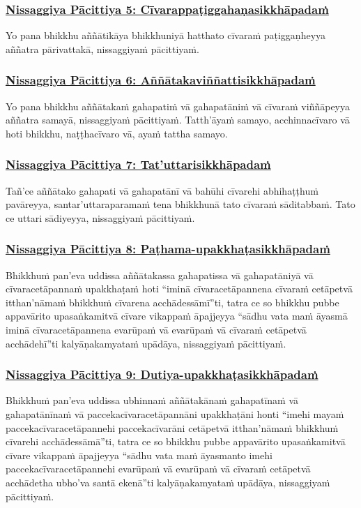 \subsubsection*{\hyperref[forf-exp5]{Nissaggiya Pācittiya 5: Cīvarappaṭiggahaṇasikkhāpadaṁ}}
\label{np5}
Yo pana bhikkhu aññātikāya bhikkhuniyā hatthato cīvaraṁ paṭiggaṇheyya aññatra pārivattakā, nissaggiyaṁ pācittiyaṁ.

\subsubsection*{\hyperref[forf-exp6]{Nissaggiya Pācittiya 6: Aññātakaviññattisikkhāpadaṁ}}
\label{np6}
Yo pana bhikkhu aññātakaṁ gahapatiṁ vā gahapatāniṁ vā cīvaraṁ viññāpeyya aññatra samayā, nissaggiyaṁ pācittiyaṁ. Tatth'āyaṁ samayo, acchinnacīvaro vā hoti bhikkhu, naṭṭhacīvaro vā, ayaṁ tattha samayo.

\subsubsection*{\hyperref[forf-exp7]{Nissaggiya Pācittiya 7: Tat'uttarisikkhāpadaṁ}}
\label{np7}
Tañ'ce aññātako gahapati vā gahapatānī vā bahūhi cīvarehi abhihaṭṭhuṁ pavāreyya, santar'uttaraparamaṁ tena bhikkhunā tato cīvaraṁ sāditabbaṁ. Tato ce uttari sādiyeyya, nissaggiyaṁ pācittiyaṁ.

\subsubsection*{\hyperref[forf-exp8]{Nissaggiya Pācittiya 8: Paṭhama-upakkhaṭasikkhāpadaṁ}}
\label{np8}
Bhikkhuṁ pan'eva uddissa aññātakassa gahapatissa vā gahapatāniyā vā cīvaracetāpannaṁ upakkhaṭaṁ hoti “iminā cīvaracetāpannena cīvaraṁ cetāpetvā itthan'nāmaṁ bhikkhuṁ cīvarena acchādessāmī”ti, tatra ce so bhikkhu pubbe appavārito upasaṅkamitvā cīvare vikappaṁ āpajjeyya “sādhu vata maṁ āyasmā iminā cīvaracetāpannena evarūpaṁ vā evarūpaṁ vā cīvaraṁ cetāpetvā acchādehī”ti kalyāṇakamyataṁ upādāya, nissaggiyaṁ pācittiyaṁ.

\subsubsection*{\hyperref[forf-exp9]{Nissaggiya Pācittiya 9: Dutiya-upakkhaṭasikkhāpadaṁ}}
\label{np9}
Bhikkhuṁ pan'eva uddissa ubhinnaṁ aññātakānaṁ gahapatīnaṁ vā gahapatānīnaṁ vā paccekacīvaracetāpannāni upakkhaṭāni honti “imehi mayaṁ paccekacīvaracetāpannehi paccekacīvarāni cetāpetvā itthan'nāmaṁ bhikkhuṁ cīvarehi acchādessāmā”ti, tatra ce so bhikkhu pubbe appavārito upasaṅkamitvā cīvare vikappaṁ āpajjeyya “sādhu vata maṁ āyasmanto imehi paccekacīvaracetāpannehi evarūpaṁ vā evarūpaṁ vā cīvaraṁ cetāpetvā acchādetha ubho'va santā ekenā”ti kalyāṇakamyataṁ upādāya, nissaggiyaṁ pācittiyaṁ.

